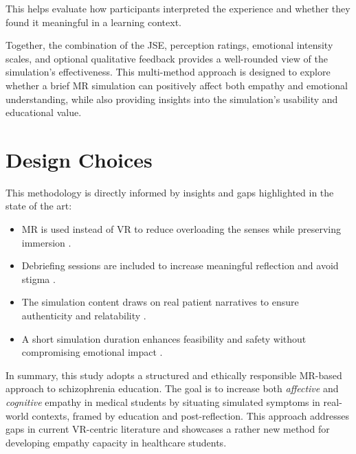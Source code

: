This helps evaluate how participants interpreted the experience and whether they found it meaningful in a learning context.


Together, the combination of the JSE, perception ratings, emotional intensity scales, and optional qualitative feedback provides a well-rounded view of the simulation’s effectiveness. This multi-method approach is designed to explore whether a brief MR simulation can positively affect both empathy and emotional understanding, while also providing insights into the simulation’s usability and educational value.

\section{Design Choices}

This methodology is directly informed by insights and gaps highlighted in the state of the art:

\begin{itemize}
    \item MR is used instead of VR to reduce overloading the senses while preserving immersion \cite{Krogmeier2024}.
    \item Debriefing sessions are included to increase meaningful reflection and avoid stigma \cite{Rueda2020, Ando2011}.
    \item The simulation content draws on real patient narratives to ensure authenticity and relatability \cite{Zare-Bidaki2022}.
    \item A short simulation duration enhances feasibility and safety without compromising emotional impact \cite{Formosa2018}.
\end{itemize}

In summary, this study adopts a structured and ethically responsible MR-based approach to schizophrenia education. The goal is to increase both \textit{affective} and \textit{cognitive} empathy in medical students by situating simulated symptoms in real-world contexts, framed by education and post-reflection. This approach addresses gaps in current VR-centric literature and showcases a rather new method for developing empathy capacity in healthcare students.

